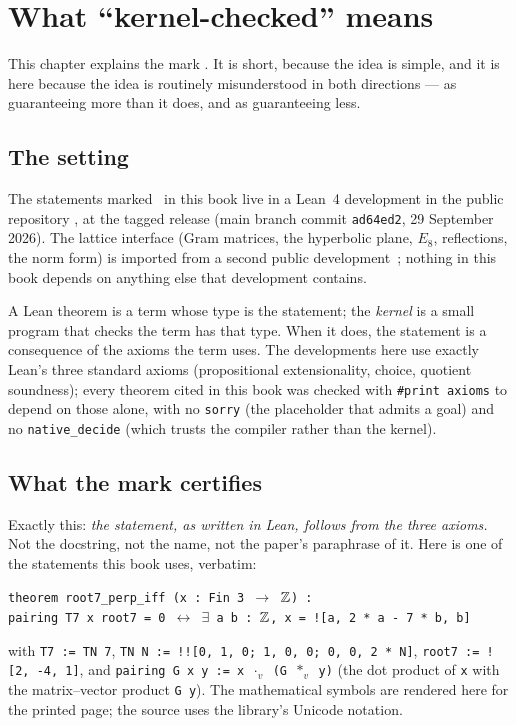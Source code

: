 \chapter{What ``kernel-checked'' means}\label{ch:formal}

This chapter explains the mark \Kstatus. It is short, because the idea is
simple, and it is here because the idea is routinely misunderstood in both
directions --- as guaranteeing more than it does, and as guaranteeing less.

\section{The setting}

The statements marked \Kstatus\ in this book live in a Lean~4 development
\cite{deMouraUllrich2021,mathlib4} in the public repository
, at the
tagged release  (main branch commit
\texttt{ad64ed2}, 29 September 2026). The lattice interface (Gram matrices,
the hyperbolic plane, $E_8$, reflections, the norm form) is imported from a
second public development~\cite{LeanMaster2026}; nothing in this book depends
on anything else that development contains.

A Lean theorem is a term whose type is the statement; the \emph{kernel} is a
small program that checks the term has that type. When it does, the
statement is a consequence of the axioms the term uses. The developments here
use exactly Lean's three standard axioms (propositional extensionality,
choice, quotient soundness); every theorem cited in this book was checked with
\texttt{\#print axioms} to depend on those alone, with no \texttt{sorry}
(the placeholder that admits a goal) and no \texttt{native\_decide} (which
trusts the compiler rather than the kernel).

\section{What the mark certifies}

Exactly this: \emph{the statement, as written in Lean, follows from the three
axioms.} Not the docstring, not the name, not the paper's paraphrase of it.
Here is one of the statements this book uses, verbatim:

\begin{leanbox}
\texttt{theorem root7\_perp\_iff (x : Fin 3 $\to$ $\mathbb{Z}$) :}\\
\texttt{\quad pairing T7 x root7 = 0 $\leftrightarrow$ $\exists$ a b : $\mathbb{Z}$, x = ![a, 2 * a - 7 * b, b]}

\smallskip\noindent
with \texttt{T7 := TN 7}, \texttt{TN N := !![0, 1, 0; 1, 0, 0; 0, 0, 2 * N]},
\texttt{root7 := ![2, -4, 1]}, and \texttt{pairing G x y := x $\cdot_v$ (G $*_v$ y)}
(the dot product of \texttt{x} with the matrix--vector product \texttt{G y}). The
mathematical symbols are rendered here for the printed page; the source uses the
library's Unicode notation.
\end{leanbox}

